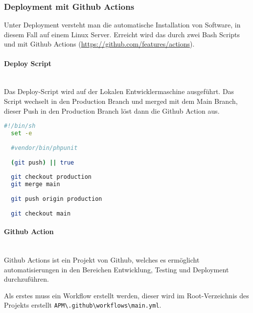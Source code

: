 \subsubsection{Deployment mit Github Actions}
Unter Deployment versteht man die automatische Installation von Software, in diesem Fall auf einem Linux Server. Erreicht wird das durch zwei Bash Scripts und mit Github Actions (\url{https://github.com/features/actions}).

\paragraph{Deploy Script}\mbox{}\\

Das Deploy-Script wird auf der Lokalen Entwicklermaschine ausgeführt. Das Script wechselt in den Production Branch und merged mit dem Main Branch, dieser Push in den Production Branch löst dann die Github Action aus.

\begin{lstlisting}[language=bash, caption={phpmyadmin.conf}]
  #!/bin/sh
  set -e
  
  #vendor/bin/phpunit
  
  (git push) || true
  
  git checkout production
  git merge main
  
  git push origin production
  
  git checkout main
\end{lstlisting}


\paragraph{Github Action}\mbox{}\\
Github Actions ist ein Projekt von Github, welches es ermöglicht automatisierungen in den Bereichen Entwicklung, Testing und Deployment durchzuführen.

Als erstes muss ein Workflow erstellt werden, dieser wird im Root-Verzeichnis des Projekts erstellt \verb|APM\.github\workflows\main.yml|.

